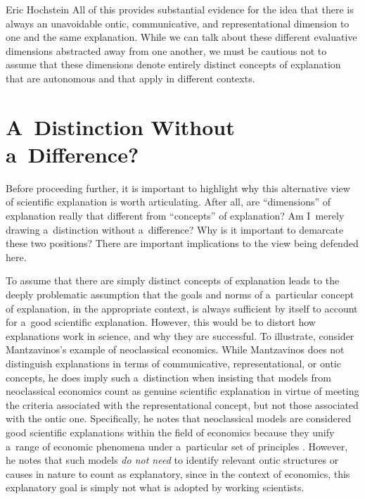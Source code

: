 \begin{artengenv}{Eric Hochstein}
All of this provides substantial evidence for the idea that there is always an unavoidable ontic, communicative, and representational dimension to one and the same explanation. While we can talk about these different evaluative dimensions abstracted away from one another, we must be cautious not to assume that these dimensions denote entirely distinct concepts of explanation that are autonomous and that apply in different contexts.

\section{A~Distinction Without a~Difference?}
Before proceeding further, it is important to highlight why this alternative view of scientific explanation is worth articulating. After all, are ``dimensions'' of explanation really that different from ``concepts'' of explanation? Am I~merely drawing a~distinction without a~difference? Why is it important to demarcate these two positions? There are important implications to the view being defended here.

To assume that there are simply distinct concepts of explanation leads to the deeply problematic assumption that the goals and norms of a~particular concept of explanation, in the appropriate context, is always sufficient by itself to account for a~good scientific explanation. However, this would be to distort how explanations work in science, and why they are successful. To illustrate, consider Mantzavinos's example of neoclassical economics. While Mantzavinos does not distinguish explanations in terms of communicative, representational, or ontic concepts, he does imply such a~distinction when insisting that models from neoclassical economics count as genuine scientific explanation in virtue of meeting the criteria associated with the representational concept, but not those associated with the ontic one. Specifically, he notes that neoclassical models are considered good scientific explanations within the field of economics because they unify a~range of economic phenomena under a~particular set of principles
\parencite[][p.12]{mantzavinos_explanatory_2016}. %
 However, he notes that such models \textit{do not need} to identify relevant ontic structures or causes in nature to count as explanatory, since in the context of economics, this explanatory goal is simply not what is adopted by working scientists.


\end{artengenv}
